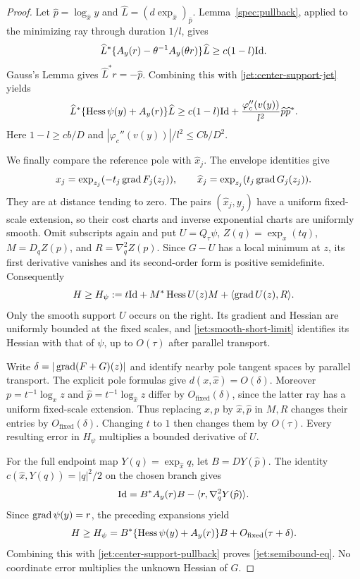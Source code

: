 \begin{proof}
Let $\widehat p=\log_{\widehat x}y$ and
$\widehat L=(d\exp_{\widehat x})_{\widehat p}$.
Lemma~\ref{spec:pullback}, applied to the minimizing ray through
duration $1/l$, gives
\[
 \widehat L^*
 \{A_y(r)-\theta^{-1}A_y(\theta r)\}\widehat L
 \ge c(1-l)\mathrm{Id}.
\]
Gauss's Lemma gives $\widehat L^*r=-\widehat p$. Combining this
with \eqref{jet:center-support-jet} yields
\begin{equation}\label{jet:center-support-pullback}
 \widehat L^*\{\operatorname{Hess}\psi(y)+A_y(r)\}\widehat L
 \ge c(1-l)\mathrm{Id}
       +\frac{\varphi_c''(v(y))}{l^2}
          \widehat p\widehat p^*.
\end{equation}
Here $1-l\ge c b/D$ and
$|\varphi_c''(v(y))|/l^2\le Cb/D^2$.

We finally compare the reference pole with $\widehat x_j$.
The envelope identities give
\[
 x_j=\exp_{z_j}(-t_j\operatorname{grad} F_j(z_j)),\qquad
 \widehat x_j=\exp_{z_j}(t_j\operatorname{grad} G_j(z_j)).
\]
They are at distance tending to zero. The pairs
$(\widehat x_j,y_j)$ have a uniform fixed-scale extension, so their
cost charts and inverse exponential charts are uniformly smooth.
Omit subscripts again and put $U=Q_\tau\psi$, $Z(q)=\exp_x(tq)$,
$M=D_qZ(p)$, and $R=\nabla_q^2Z(p)$.
Since $G-U$ has a local minimum at $z$, its first derivative
vanishes and its second-order form is positive semidefinite.
Consequently
\[
 H\ge H_\psi
 :=t\mathrm{Id}+M^*\operatorname{Hess} U(z)M+\langle\operatorname{grad} U(z),R\rangle.
\]
Only the smooth support $U$ occurs on the right. Its gradient
and Hessian are uniformly bounded at the fixed scales, and
\eqref{jet:smooth-short-limit} identifies its Hessian with that
of $\psi$, up to $O(\tau)$ after parallel transport.

Write $\delta=|\operatorname{grad}(F+G)(z)|$ and identify nearby pole
tangent spaces by parallel transport. The explicit pole formulas
give $d(x,\widehat x)=O(\delta)$.
Moreover $p=t^{-1}\log_xz$ and
$\widehat p=t^{-1}\log_{\widehat x}z$ differ by
$O_{\mathrm{fixed}}(\delta)$, since the latter ray has a
uniform fixed-scale extension. Thus replacing $x,p$ by
$\widehat x,\widehat p$ in $M,R$ changes their entries by
$O_{\mathrm{fixed}}(\delta)$. Changing $t$ to $1$ then
changes them by $O(\tau)$. Every resulting error in $H_\psi$
multiplies a bounded derivative of $U$.

For the full endpoint map $Y(q)=\exp_{\widehat x}q$, let
$B=DY(\widehat p)$. The identity
$c(\widehat x,Y(q))=|q|^2/2$ on the chosen branch gives
\[
 \mathrm{Id}=B^*A_y(r)B-\langle r,\nabla_q^2Y(\widehat p)\rangle.
\]
Since $\operatorname{grad}\psi(y)=r$, the preceding expansions yield
\[
 H\ge H_\psi
 =B^*\{\operatorname{Hess}\psi(y)+A_y(r)\}B
       +O_{\mathrm{fixed}}(\tau+\delta).
\]
Combining this with \eqref{jet:center-support-pullback}
proves \eqref{jet:semibound-eq}. No coordinate error
multiplies the unknown Hessian of $G$.
\end{proof}

